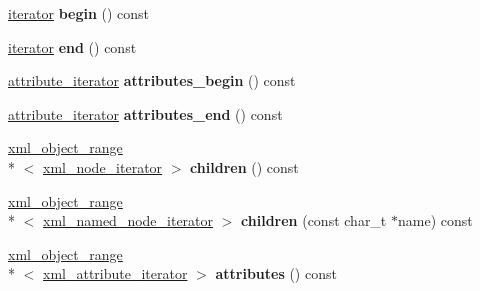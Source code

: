 \begin{DoxyCompactItemize}
\item 
\hypertarget{classpugi_1_1xml__node_af1cfcc7ccae47095cd781a3c9c9b06e4}{\hyperlink{classpugi_1_1xml__node__iterator}{iterator} {\bfseries begin} () const }\label{classpugi_1_1xml__node_af1cfcc7ccae47095cd781a3c9c9b06e4}

\item 
\hypertarget{classpugi_1_1xml__node_a6e5b29519d6a1f08aa936d96624e095a}{\hyperlink{classpugi_1_1xml__node__iterator}{iterator} {\bfseries end} () const }\label{classpugi_1_1xml__node_a6e5b29519d6a1f08aa936d96624e095a}

\item 
\hypertarget{classpugi_1_1xml__node_a1b4ab605d879cf5623e20505500b836e}{\hyperlink{classpugi_1_1xml__attribute__iterator}{attribute\-\_\-iterator} {\bfseries attributes\-\_\-begin} () const }\label{classpugi_1_1xml__node_a1b4ab605d879cf5623e20505500b836e}

\item 
\hypertarget{classpugi_1_1xml__node_a528b9274b0adeeda5ed12567057bee17}{\hyperlink{classpugi_1_1xml__attribute__iterator}{attribute\-\_\-iterator} {\bfseries attributes\-\_\-end} () const }\label{classpugi_1_1xml__node_a528b9274b0adeeda5ed12567057bee17}

\item 
\hypertarget{classpugi_1_1xml__node_a267ab4724e63940e5a50234fc52bc855}{\hyperlink{classpugi_1_1xml__object__range}{xml\-\_\-object\-\_\-range}\\*
$<$ \hyperlink{classpugi_1_1xml__node__iterator}{xml\-\_\-node\-\_\-iterator} $>$ {\bfseries children} () const }\label{classpugi_1_1xml__node_a267ab4724e63940e5a50234fc52bc855}

\item 
\hypertarget{classpugi_1_1xml__node_afa490049463cabe6c5b5d774d85e5569}{\hyperlink{classpugi_1_1xml__object__range}{xml\-\_\-object\-\_\-range}\\*
$<$ \hyperlink{classpugi_1_1xml__named__node__iterator}{xml\-\_\-named\-\_\-node\-\_\-iterator} $>$ {\bfseries children} (const char\-\_\-t $\ast$name) const }\label{classpugi_1_1xml__node_afa490049463cabe6c5b5d774d85e5569}

\item 
\hypertarget{classpugi_1_1xml__node_a35f616e0f529ec690b06ff0760d3f969}{\hyperlink{classpugi_1_1xml__object__range}{xml\-\_\-object\-\_\-range}\\*
$<$ \hyperlink{classpugi_1_1xml__attribute__iterator}{xml\-\_\-attribute\-\_\-iterator} $>$ {\bfseries attributes} () const }\label{classpugi_1_1xml__node_a35f616e0f529ec690b06ff0760d3f969}


\end{DoxyCompactItemize}

